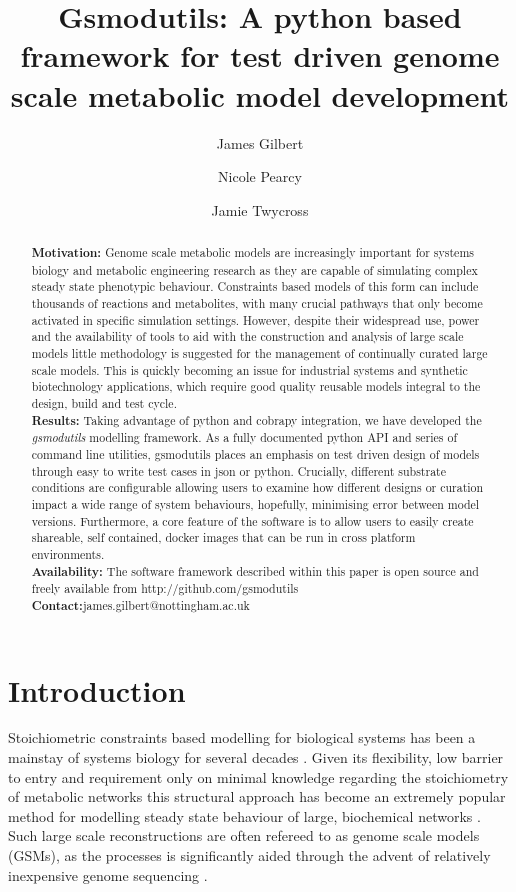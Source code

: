 \documentclass[a4paper,10pt]{article}
\title{Gsmodutils: A python based framework for test driven genome scale metabolic model development}
\author[1]{James Gilbert}
\author[1]{Nicole Pearcy}
\author[2]{Jamie Twycross}
\affil[1]{Synthetic Biology Research Centre, University of Nottingham, Nottingham, NG7 2RD, United Kingdom}
\affil[2]{Intelligent Modelling and Analysis group, School of Computer Science, University of Nottingham, Nottingham, NG7 2RD, United Kingdom}
\begin{document}
\maketitle

\begin{abstract}
\textbf{Motivation:} Genome scale metabolic models are increasingly important for systems biology and metabolic engineering research as they are capable of simulating complex steady state phenotypic behaviour.
Constraints based models of this form can include thousands of reactions and metabolites, with many crucial pathways that only become activated in specific simulation settings.
However, despite their widespread use, power and the availability of tools to aid with the construction and analysis of large scale models little methodology is suggested for the management of continually curated large scale models.
This is quickly becoming an issue for industrial systems and synthetic biotechnology applications, which require good quality reusable models integral to the design, build and test cycle.
\\
\textbf{Results:} Taking advantage of python and cobrapy integration, we have developed the \textit{gsmodutils} modelling framework.
As a fully documented python API and series of command line utilities, gsmodutils places an emphasis on test driven design of models through easy to write test cases in json or python.
Crucially, different substrate conditions are configurable allowing users to examine how different designs or curation impact a wide range of system behaviours, hopefully, minimising error between model versions.
Furthermore, a core feature of the software is to allow users to easily create shareable, self contained, docker images that can be run in cross platform environments.\\
\textbf{Availability:} The software framework described within this paper is open source and freely available from http://github.com/gsmodutils \\
\textbf{Contact:}{james.gilbert@nottingham.ac.uk}
\end{abstract}


\section{Introduction}
Stoichiometric constraints based modelling for biological systems has been a mainstay of systems biology for several decades \cite{fell1986fat, varma1994stoichiometric}.
Given its flexibility, low barrier to entry and requirement only on minimal knowledge regarding the stoichiometry of metabolic networks this structural approach has become an extremely popular method for modelling steady state behaviour of large, biochemical networks \cite{kauffman2003advances}.
Such large scale reconstructions are often refereed to as genome scale models (GSMs), as the processes is significantly aided through the advent of relatively inexpensive genome sequencing \cite{o2015using, land2015insights}.
\end{document}
